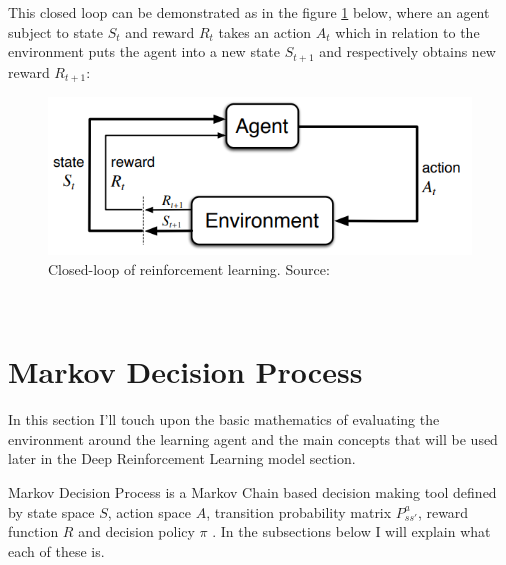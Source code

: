 This closed loop can be demonstrated as in the figure \ref{fig:closed_loop} below, where an agent subject to state $S_{t}$
and reward $R_{t}$ takes an action $A_{t}$ which 
in relation to the environment puts the agent
into a new state $S_{t+1}$ and respectively obtains new reward $R_{t+1}$:

\begin{figure}[h!]
  \centering
  \includegraphics[scale=0.7]{figures/closed_loop.PNG}
  \caption{Closed-loop of reinforcement learning. Source: \cite{sutton_barto}}
  \label{fig:closed_loop}
\end{figure}\\  


 
\section{Markov Decision Process}

In this section I'll touch upon the basic mathematics of evaluating the environment around the learning agent and the 
main concepts that will be used later in the 
Deep Reinforcement Learning model section.

Markov Decision Process is a Markov Chain based decision making
tool defined by state space $S$, action space $A$, transition 
probability matrix $P^{a}_{ss'}$, reward 
function $R$ and decision policy $\pi$ \cite{lecture_mdp}. In 
the subsections below I will explain what each of these is.

